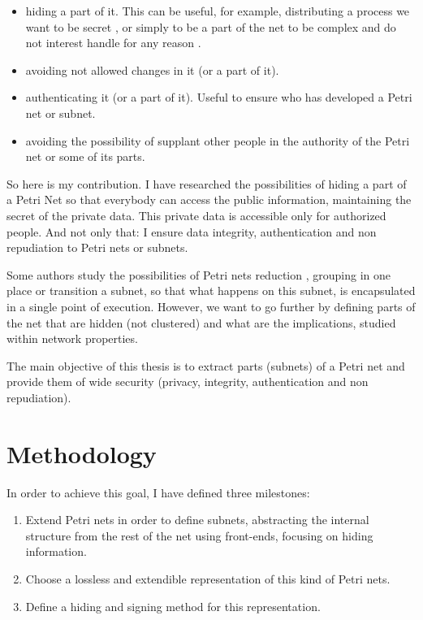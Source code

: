 \begin{itemize}
\item 
hiding a part of it. This can be useful, for example,
distributing a process we want to be secret \citep{HID-Inigo2011MT},
or simply to be a part of the net to be complex and do not
interest handle for any reason \citep{HID-Inigo2011MT}.

\item avoiding not allowed changes in it (or a part of it).
\item authenticating it (or a part of it). Useful to ensure who has developed
a Petri net or subnet.
\item avoiding the possibility of supplant other people in the authority of
the Petri net or some of its parts.

\end{itemize}
So here is my contribution. I have researched the possibilities of hiding
a part of a Petri Net so that everybody can access the public information,
maintaining the secret of the private data. This private data is accessible only
for authorized people. And not only that: I ensure data integrity, authentication
and non repudiation to Petri nets or subnets.

Some authors study the possibilities of Petri nets reduction \citep{SN-Valette197935,SN-Suzuki198351,SN-Fahmy1990321,SN-DRUZHININVA19921922,SN-Fahmy1993127,R-Xia20111662}, grouping
in one place or transition a subnet, so that what happens
on this subnet, is encapsulated in a single point of execution. However,
we want to go further by defining parts of the net that are hidden (not clustered) and what are the implications, studied within
network properties.

The main objective of this thesis is to extract parts (subnets) of a Petri net and provide
them of wide security (privacy, integrity, authentication and non repudiation).



\section{Methodology}


In order to achieve this goal, I have defined three milestones:

\begin{enumerate}
\item
Extend Petri nets in order to define subnets, abstracting the
internal structure from the rest of the net using front-ends, focusing on hiding information. 
\item
Choose a lossless and extendible representation
of this kind of Petri nets.
\item
Define a hiding and signing method for this representation.
\end{enumerate}



